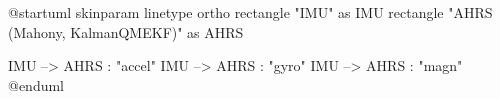 \documentclass[11pt]{article}
\begin{document}
\begin{plantuml}
@startuml
skinparam linetype ortho
rectangle "IMU" as IMU
rectangle "AHRS (Mahony, KalmanQMEKF)" as AHRS

IMU --> AHRS : "accel"
IMU --> AHRS : "gyro"
IMU --> AHRS : "magn"
@enduml
\end{plantuml}
\end{document}
